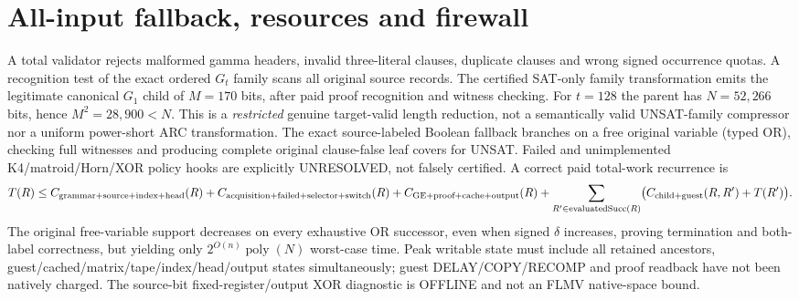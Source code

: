 \documentclass[11pt]{article}
\begin{document}
\section{All-input fallback, resources and firewall}
A total validator rejects malformed gamma headers, invalid three-literal clauses, duplicate clauses and wrong signed occurrence quotas. A recognition test of the exact ordered $G_t$ family scans all original source records. The certified SAT-only family transformation emits the legitimate canonical $G_1$ child of $M=170$ bits, after paid proof recognition and witness checking. For $t=128$ the parent has $N=52,266$ bits, hence $M^2=28,900<N$. This is a \emph{restricted} genuine target-valid length reduction, not a semantically valid UNSAT-family compressor nor a uniform power-short ARC transformation. The exact source-labeled Boolean fallback branches on a free original variable (typed OR), checking full witnesses and producing complete original clause-false leaf covers for UNSAT. Failed and unimplemented K4/matroid/Horn/XOR policy hooks are explicitly UNRESOLVED, not falsely certified.
A correct paid total-work recurrence is
\[
 T(R)\le C_{\rm grammar+source+index+head}(R)
 + C_{\rm acquisition+failed+selector+switch}(R)
 + C_{\rm GE+proof+cache+output}(R)
 +\sum_{R'\in\operatorname{evaluatedSucc}(R)}
 \bigl(C_{\rm child+guest}(R,R')+T(R')\bigr).
\]
The original free-variable support decreases on every exhaustive OR successor, even when signed $\delta$ increases, proving termination and both-label correctness, but yielding only $2^{O(n)}\operatorname{poly}(N)$ worst-case time. Peak writable state must include all retained ancestors, guest/cached/matrix/tape/index/head/output states simultaneously; guest DELAY/COPY/RECOMP and proof readback have not been natively charged. The source-bit fixed-register/output XOR diagnostic is OFFLINE and not an FLMV native-space bound.
\end{document}
